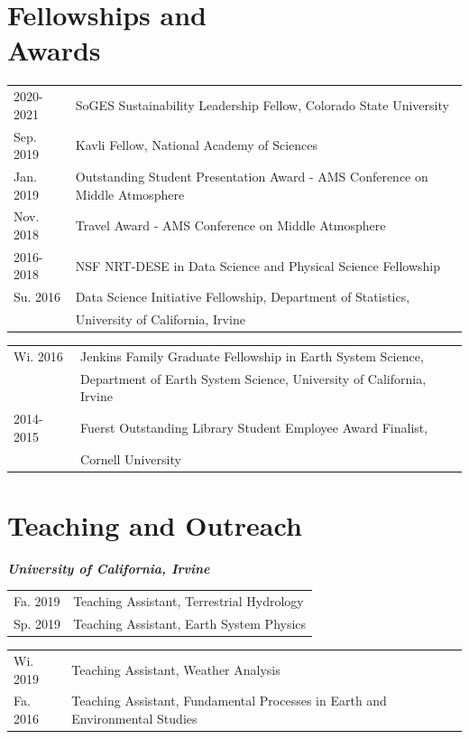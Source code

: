 \documentclass[margin,line,palatino,courier,10pt]{res}
\begin{document}
\begin{resume}
\section{\sc \textcolor{Cerulean}{\large{\textbf{Fellowships and\\ Awards}}}}
\begin{tabular}{@{}p{0.9in}p{4in}}
2020-2021 & SoGES Sustainability Leadership Fellow, Colorado State University\\
Sep. 2019 & Kavli Fellow, National Academy of Sciences\\
Jan. 2019 & Outstanding Student Presentation Award - AMS Conference on Middle Atmosphere\\
Nov. 2018 & Travel Award - AMS Conference on Middle Atmosphere\\
2016-2018 & NSF NRT-DESE in Data Science and Physical Science Fellowship\\
Su. 2016 & Data Science Initiative Fellowship, Department of Statistics, \\
& University of California, Irvine\\
\end{tabular}
\begin{tabular}{@{}p{0.9in}p{4in}}
Wi. 2016 & Jenkins Family Graduate Fellowship in Earth System Science,\\ 
& Department of Earth System
Science, University of California, Irvine\\
2014-2015 & Fuerst Outstanding Library Student Employee Award Finalist,\\
& Cornell University
\end{tabular}


\vspace{-0.1in}
\noindent\textcolor{Cerulean}{\makebox[\linewidth][r]{\rule{\textwidth}{5pt}}}
\vspace{-0.3in}

\section{\sc \textcolor{Cerulean}{\large{\textbf{Teaching and Outreach}}}}

\textit{\textbf{University of California, Irvine}}
\vspace*{0.05in}\\
\begin{tabular}{@{}p{0.9in}p{4in}}
Fa. 2019 & Teaching Assistant, Terrestrial Hydrology\\
Sp. 2019 & Teaching Assistant, Earth System Physics\\
\end{tabular}
\begin{tabular}{@{}p{0.9in}p{4in}}
Wi. 2019 & Teaching Assistant, Weather Analysis\\
Fa. 2016 & Teaching Assistant, Fundamental Processes in Earth and Environmental Studies\\
\end{tabular}


\end{resume}
\end{document}
